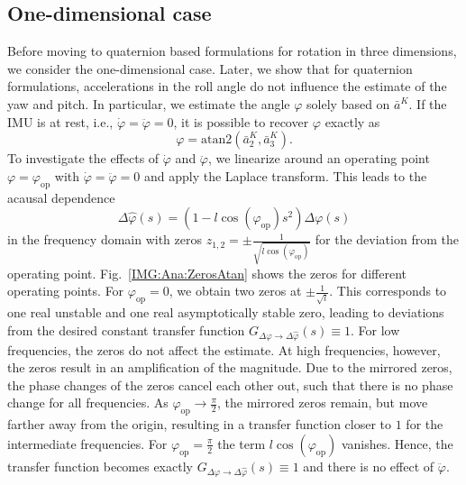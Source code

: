 \subsection{One-dimensional case}\label{sec:Analysis:OneDim}
Before moving to quaternion based formulations for rotation in three dimensions, we consider the one-dimensional case. 
Later, we show that for quaternion formulations, accelerations in the roll angle do not influence the estimate of the yaw and pitch.
In particular, we estimate the angle $\varphi$ solely based on $\bar{a}^K$.
If the \ac{IMU} is at rest, i.e., $\dot{\varphi}=\ddot{\varphi}=0$, it is possible to recover $\varphi$ exactly as
\begin{equation}
	\varphi = \mathrm{atan2}(\bar{a}^K_2, \bar{a}^K_3).
\end{equation}
To investigate the effects of $\dot{\varphi}$ and $\ddot{\varphi}$, we linearize around an operating point $\varphi=\varphi_{\mathrm{op}}$ with $\dot{\varphi}=\ddot{\varphi}=0$ and apply the Laplace transform.
This leads to the acausal dependence
\begin{equation}\label{eq:Ana:tfAtan}
	\Delta \hat{\varphi}(s) = (1-l\cos(\varphi_{\mathrm{op}})s^2) \Delta \varphi(s)	
\end{equation}
in the frequency domain with zeros $z_{1,2}=\pm\frac{1}{\sqrt{l\cos(\varphi_{\mathrm{op}})}}$ for the deviation from the operating point.
Fig.~\ref{IMG:Ana:ZerosAtan} shows the zeros for different operating points.
For $\varphi_{\mathrm{op}} = 0$, we obtain two zeros at $\pm \frac{1}{\sqrt{l}}$. 
This corresponds to one real unstable and one real asymptotically stable zero, leading to deviations from the desired constant transfer function $G_{\Delta \varphi \to \Delta \hat{\varphi}}(s) \equiv 1$.
For low frequencies, the zeros do not affect the estimate.
At high frequencies, however, the zeros result in an amplification of the magnitude.
Due to the mirrored zeros, the phase changes of the zeros cancel each other out, such that there is no phase change for all frequencies.
As $\varphi_{\mathrm{op}}\to\frac{\pi}{2}$, the mirrored zeros remain, but move farther away from the origin, resulting in a transfer function closer to $1$ for the intermediate frequencies.
For $\varphi_{\mathrm{op}}=\frac{\pi}{2}$ the term $l\cos(\varphi_{\mathrm{op}})$ vanishes.
Hence, the transfer function becomes exactly $G_{\Delta \varphi \to \Delta \hat{\varphi}}(s) \equiv1$ and there is no effect of $\ddot{\varphi}$.

